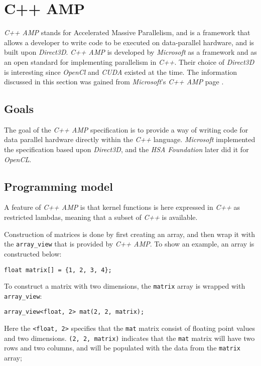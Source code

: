 \section{C++ AMP} \label{cha:cppAmpRelWork}
\textit{C++ AMP} stands for Accelerated Massive Parallelism, and is a framework that allows a developer to write code to be executed on data-parallel hardware, and is built upon \textit{Direct3D}. \textit{C++ AMP} is developed by \textit{Microsoft} as a framework and as an open standard for implementing parallelism in \textit{C++}. Their choice of \textit{Direct3D} is interesting since \textit{OpenCl} and \textit{CUDA} existed at the time. The information discussed in this section was gained from \textit{Microsoft}'s \textit{C++ AMP} page \cite{microsoftCppAMP}.


\subsection{Goals}
The goal of the \textit{C++ AMP} specification is to provide a way of writing code for data parallel hardware directly within the \textit{C++} language. \textit{Microsoft} implemented the specification based upon \textit{Direct3D}, and the \textit{HSA Foundation} later did it for \textit{OpenCL}.

\subsection{Programming model}
A feature of \textit{C++ AMP} is that kernel functions is here expressed in \textit{C++} as restricted lambdas, meaning that a subset of \textit{C++} is available. 

Construction of matrices is done by first creating an array, and then wrap it with the \texttt{array\_view} that is provided by \textit{C++ AMP}. To show an example, an array is constructed below:
\begin{lstlisting}
float matrix[] = {1, 2, 3, 4}; 
\end{lstlisting}
To construct a matrix with two dimensions, the \texttt{matrix} array is wrapped with \texttt{array\_view}:
\begin{lstlisting}
array_view<float, 2> mat(2, 2, matrix); 
\end{lstlisting}
Here the \texttt{<float, 2>} specifies that the \texttt{mat} matrix consist of floating point values and two dimensions. \texttt{(2, 2, matrix)} indicates that the \texttt{mat} matrix will have two rows and two columns, and will be populated with the data from the \texttt{matrix} array;

